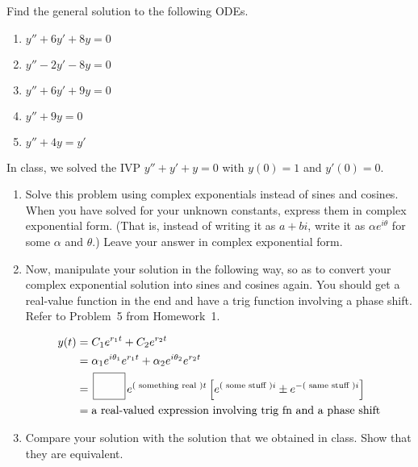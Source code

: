 \documentclass[12pt,letterpaper]{hmcpset}
\newcommand{\mybox}{\mbox{\hspace{.02in}}\fbox{\rule[-1mm]{0mm}{6mm}\hspace{.30in}}\mbox{\hspace{.02in}}}
\begin{document}

\begin{problem}[1]
    Find the general solution to the following ODEs.
    \begin{enumerate}
        \item $y'' + 6y' + 8y = 0$
        \item $y'' - 2y' - 8y = 0$ 
        \item $y'' + 6y' + 9y  = 0 $
        \item $y'' + 9y = 0$
        \item $y'' + 4y = y'$
    \end{enumerate}
\end{problem}

\begin{solution}
    \vfill
\end{solution}
\newpage

\begin{problem}[2]
    In class, we solved the IVP $y''+y'+y=0$ with $y(0)=1$ and $y'(0)=0$.
    \begin{enumerate}
        \item Solve this problem using complex exponentials instead of sines and cosines. When you have solved for your unknown constants, express them in complex exponential form. (That is, instead of writing it as $a+bi$, write it as $\alpha e^{i\theta}$ for some $\alpha$ and $\theta$.) Leave your answer in complex exponential form.
        \item Now, manipulate your solution in the following way, so as to convert your complex exponential solution into sines and cosines again. You should get a real-value function in the end and have a trig function involving a phase shift. Refer to Problem~5 from Homework~1.

            \begin{align*}
                y(t)&= C_1e^{r_1 t}+ C_2e^{r_2 t} \\
                    &=\alpha_1 e^{i\theta_1}e^{r_1 t}+\alpha_2 e^{i\theta_2}e^{r_2 t} \\
                    &= \mybox e^{(\text{ something real })t}\left[e^{(\text{ some stuff })i} \pm e^{-(\text{ same stuff })i} \right] \\
                    &=\text{a real-valued expression involving trig fn and a phase shift}
            \end{align*}
        \item Compare your solution with the solution that we obtained in class. Show that they are equivalent.
    \end{enumerate}
\end{problem}
\end{document}

